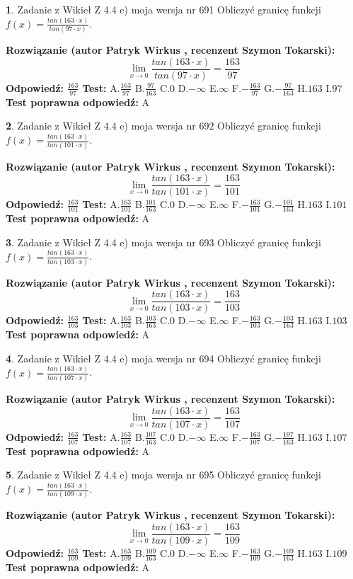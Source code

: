 \documentclass[12pt, a4paper]{article}
\theoremstyle{definition} %
\newtheorem{zad}{}
\newcommand{\zadStart}[1]{\begin{zad}#1\newline}
\newcommand{\zadStop}{\end{zad}}
\newcommand{\rozwStart}[2]{\noindent \textbf{Rozwiązanie (autor #1 , recenzent #2): }\newline}
\newcommand{\rozwStop}{\newline}
\newcommand{\odpStart}{\noindent \textbf{Odpowiedź:}\newline}
\newcommand{\odpStop}{\newline}
\newcommand{\testStart}{\noindent \textbf{Test:}\newline}
\newcommand{\testStop}{\newline}
\newcommand{\kluczStart}{\noindent \textbf{Test poprawna odpowiedź:}\newline}
\newcommand{\kluczStop}{\newline}
\begin{document}
\zadStart{Zadanie z Wikieł Z 4.4 e) moja wersja nr 691}
Obliczyć granicę funkcji $f(x)=\frac{tan(163\cdot x)}{tan(97\cdot x)}$.
\zadStop
\rozwStart{Patryk Wirkus}{Szymon Tokarski}
$$\lim\limits_{x\to 0}\frac{tan(163\cdot x)}{tan(97\cdot x)}=
\frac{163}{97}$$
\rozwStop
\odpStart
$\frac{163}{97}$
\odpStop
\testStart
A.$\frac{163}{97}$
B.$\frac{97}{163}$
C.$0$
D.$-\infty$
E.$\infty$
F.$-\frac{163}{97}$
G.$-\frac{97}{163}$
H.$163$
I.$97$
\testStop
\kluczStart
A
\kluczStop



\zadStart{Zadanie z Wikieł Z 4.4 e) moja wersja nr 692}
Obliczyć granicę funkcji $f(x)=\frac{tan(163\cdot x)}{tan(101\cdot x)}$.
\zadStop
\rozwStart{Patryk Wirkus}{Szymon Tokarski}
$$\lim\limits_{x\to 0}\frac{tan(163\cdot x)}{tan(101\cdot x)}=
\frac{163}{101}$$
\rozwStop
\odpStart
$\frac{163}{101}$
\odpStop
\testStart
A.$\frac{163}{101}$
B.$\frac{101}{163}$
C.$0$
D.$-\infty$
E.$\infty$
F.$-\frac{163}{101}$
G.$-\frac{101}{163}$
H.$163$
I.$101$
\testStop
\kluczStart
A
\kluczStop



\zadStart{Zadanie z Wikieł Z 4.4 e) moja wersja nr 693}
Obliczyć granicę funkcji $f(x)=\frac{tan(163\cdot x)}{tan(103\cdot x)}$.
\zadStop
\rozwStart{Patryk Wirkus}{Szymon Tokarski}
$$\lim\limits_{x\to 0}\frac{tan(163\cdot x)}{tan(103\cdot x)}=
\frac{163}{103}$$
\rozwStop
\odpStart
$\frac{163}{103}$
\odpStop
\testStart
A.$\frac{163}{103}$
B.$\frac{103}{163}$
C.$0$
D.$-\infty$
E.$\infty$
F.$-\frac{163}{103}$
G.$-\frac{103}{163}$
H.$163$
I.$103$
\testStop
\kluczStart
A
\kluczStop



\zadStart{Zadanie z Wikieł Z 4.4 e) moja wersja nr 694}
Obliczyć granicę funkcji $f(x)=\frac{tan(163\cdot x)}{tan(107\cdot x)}$.
\zadStop
\rozwStart{Patryk Wirkus}{Szymon Tokarski}
$$\lim\limits_{x\to 0}\frac{tan(163\cdot x)}{tan(107\cdot x)}=
\frac{163}{107}$$
\rozwStop
\odpStart
$\frac{163}{107}$
\odpStop
\testStart
A.$\frac{163}{107}$
B.$\frac{107}{163}$
C.$0$
D.$-\infty$
E.$\infty$
F.$-\frac{163}{107}$
G.$-\frac{107}{163}$
H.$163$
I.$107$
\testStop
\kluczStart
A
\kluczStop



\zadStart{Zadanie z Wikieł Z 4.4 e) moja wersja nr 695}
Obliczyć granicę funkcji $f(x)=\frac{tan(163\cdot x)}{tan(109\cdot x)}$.
\zadStop
\rozwStart{Patryk Wirkus}{Szymon Tokarski}
$$\lim\limits_{x\to 0}\frac{tan(163\cdot x)}{tan(109\cdot x)}=
\frac{163}{109}$$
\rozwStop
\odpStart
$\frac{163}{109}$
\odpStop
\testStart
A.$\frac{163}{109}$
B.$\frac{109}{163}$
C.$0$
D.$-\infty$
E.$\infty$
F.$-\frac{163}{109}$
G.$-\frac{109}{163}$
H.$163$
I.$109$
\testStop
\kluczStart
A
\kluczStop
\end{document}
